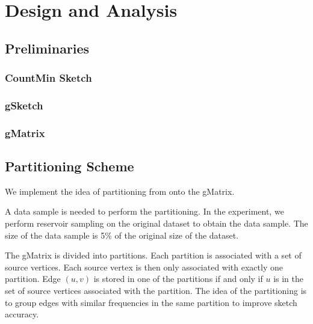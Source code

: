 
\chapter{Design and Analysis}

\ifpdf
    \graphicspath{{Chapter2/Figs/Raster/}{Chapter2/Figs/PDF/}{Chapter2/Figs/}}
\else
    \graphicspath{{Chapter2/Figs/Vector/}{Chapter2/Figs/}}
\fi


\section{Preliminaries}

\subsection{CountMin Sketch}

\subsection{gSketch}

\subsection{gMatrix}

\section{Partitioning Scheme}

We implement the idea of partitioning from \cite{DBLP} onto the gMatrix.

A data sample is needed to perform the partitioning. In the experiment, we perform reservoir sampling on the original dataset to obtain the data sample. The size of the data sample is 5\% of the original size of the dataset.

The gMatrix is divided into partitions. Each partition is associated with a set of source vertices. Each source vertex is then only associated with exactly one partition. Edge $(u,v)$ is stored in one of the partitions if and only if $u$ is in the set of source vertices associated with the partition. The idea of the partitioning is to group edges with similar frequencies in the same partition to improve sketch accuracy.

